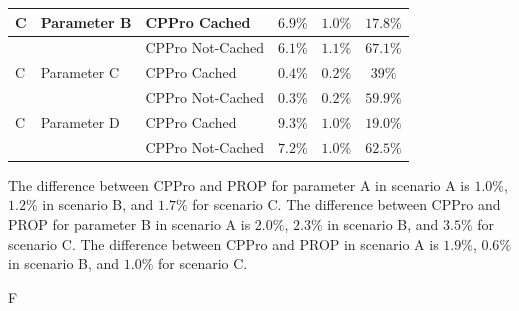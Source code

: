 \documentclass[10pt,final,journal,a4paper]{IEEEtran}
\begin{document}
\begin{table}[!t]
\begin{tabular}{|l|l|l|c|c|c|}
C & Parameter B & CPPro Cached & $6.9\%$ & $1.0\%$ & $17.8\%$ \\
\hline
 & & CPPro Not-Cached & $6.1\%$ & $1.1\%$ & $67.1$\% \\
\hline

C & Parameter C & CPPro Cached & $0.4\%$ & $0.2\%$ & $39\%$ \\
\hline
 & & CPPro Not-Cached & $0.3\%$ & $0.2\%$ & $59.9\%$ \\
\hline

C & Parameter D & CPPro Cached & $9.3\%$ & $1.0\%$ & $19.0\%$ \\
\hline
 & & CPPro Not-Cached & $7.2\%$ & $1.0\%$ & $62.5\%$ \\
\hline

\end{tabular}
\end{table}








The difference between CPPro and PROP for parameter A in scenario A is $1.0\%$, $1.2\%$ in scenario B, and $1.7\%$ for scenario C.
The difference between CPPro and PROP for parameter B in scenario A is $2.0\%$, $2.3\%$ in scenario B, and $3.5\%$ for scenario C.
The difference between CPPro and PROP in scenario A is $1.9\%$, $0.6\%$ in scenario B, and $1.0\%$ for scenario C.






F%
\end{document}
